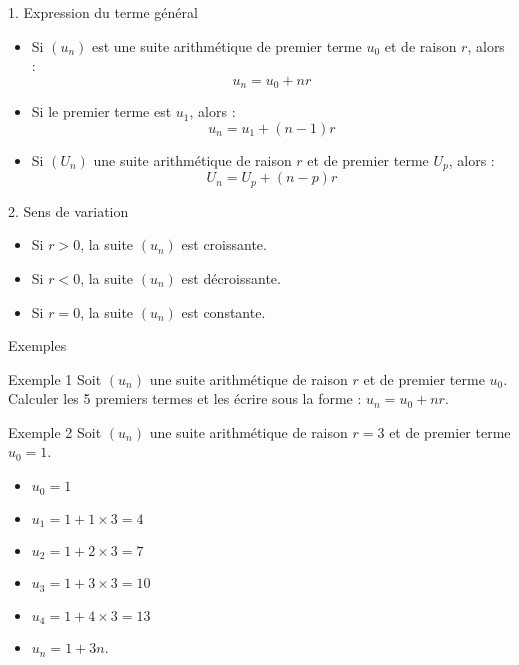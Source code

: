 \documentclass{beamer}
\begin{document}
\begin{frame}{1. Expression du terme général}
    \begin{itemize}
        \item Si $\left(u_{n}\right)$ est une suite arithmétique de premier terme $u_{0}$ et de raison $r$, alors :
            \[u_{n}=u_{0}+nr\]
        \item Si le premier terme est $u_{1}$, alors :
            \[u_{n}=u_{1}+(n-1)r\]
        \item Si $(U_n)$ une suite arithmétique de raison $r$ et de premier terme $U_{p}$, alors :
            \[U_{n}=U_{p}+(n-p)r\]
    \end{itemize}
\end{frame}

\begin{frame}{2. Sens de variation}
    \begin{itemize}
        \item Si $r>0$, la suite $\left(u_{n}\right)$ est croissante.
        \item Si $r<0$, la suite $\left(u_{n}\right)$ est décroissante.
        \item Si $r=0$, la suite $\left(u_{n}\right)$ est constante.
    \end{itemize}
\end{frame}

\begin{frame}{Exemples}
    \begin{exampleblock}{Exemple 1}
        Soit $\left(u_{n}\right)$ une suite arithmétique de raison $r$ et de premier terme $u_{0}$. Calculer les 5 premiers termes et les écrire sous la forme : $u_{n}=u_{0}+nr.$
    \end{exampleblock}
    \begin{exampleblock}{Exemple 2}
        Soit $\left(u_{n}\right)$ une suite arithmétique de raison $r=3$ et de premier terme $u_{0}=1$. 
        \begin{itemize}
            \item $u_{0}=1$
            \item $u_{1}=1+1\times 3=4$
            \item $u_{2}=1+2\times 3=7$
            \item $u_{3}=1+3\times 3=10$
            \item $u_{4}=1+4\times 3=13$
            \item $u_{n}=1+3n.$
        \end{itemize}
    \end{exampleblock}
\end{frame}
\end{document}
